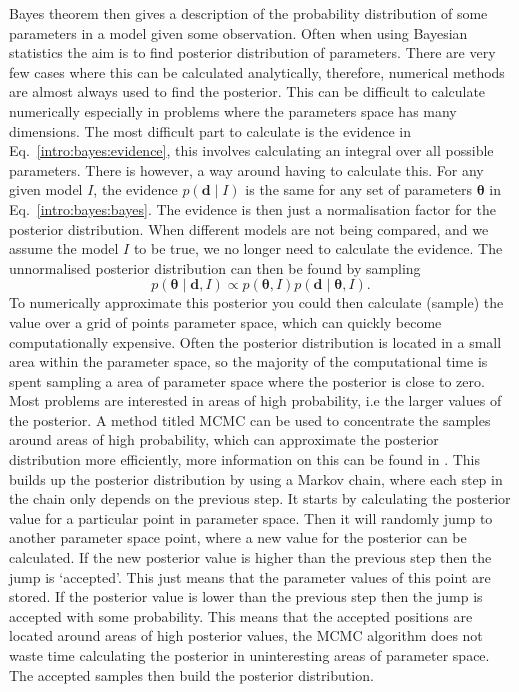 Bayes theorem then gives a description of the probability distribution of some parameters in a model given some observation.
Often when using Bayesian statistics the aim is to find posterior distribution of parameters.
There are very few cases where this can be calculated analytically, therefore, numerical methods are almost always used to find the posterior.
This can be difficult to calculate numerically especially in problems where the parameters space has many dimensions.
The most difficult part to calculate is the evidence in Eq.~\ref{intro:bayes:evidence}, this involves calculating an integral over all possible parameters.
There is however, a way around having to calculate this. For any given model $I$, the evidence $p({\bm d}\mid I)$ is the same for any set of parameters ${\bm \theta}$ in Eq.~\ref{intro:bayes:bayes}. 
The evidence is then just a normalisation factor for the posterior distribution. 
When different models are not being compared, and we assume the model $I$ to be true, we no longer need to calculate the evidence.
The unnormalised posterior distribution can then be found by sampling
\begin{equation}
p({\bm \theta} \mid {\bm d}, I) \propto p({\bm \theta}, I)p({\bm d} \mid {\bm \theta}, I).
\end{equation}
To numerically approximate this posterior you could then calculate (sample) the value over a grid of points parameter space, which can quickly become computationally expensive. Often the posterior distribution is located in a small area within the parameter space, so the majority of the computational time is spent sampling a area of parameter space where the posterior is close to zero.
Most problems are interested in areas of high probability, i.e the larger values of the posterior. 
A method titled \gls{MCMC} can be used to concentrate the samples around areas of high probability, which can approximate the posterior distribution more efficiently, more information on this can be found in \citep{metropolis1953EquationState,vanravenzwaaij2018SimpleIntroduction,sharma2017MarkovChain}.
This builds up the posterior distribution by using a Markov chain, where each step in the chain only depends on the previous step.
It starts by calculating the posterior value for a particular point in parameter space. Then it will randomly jump to another parameter space point, where a new value for the posterior can be calculated.
If the new posterior value is higher than the previous step then the jump is `accepted'. This just means that the parameter values of this point are stored.
If the posterior value is lower than the previous step then the jump is accepted with some probability.
This means that the accepted positions are located around areas of high posterior values, the \gls{MCMC} algorithm does not waste time calculating the posterior in uninteresting areas of parameter space.
The accepted samples then build the posterior distribution. 

